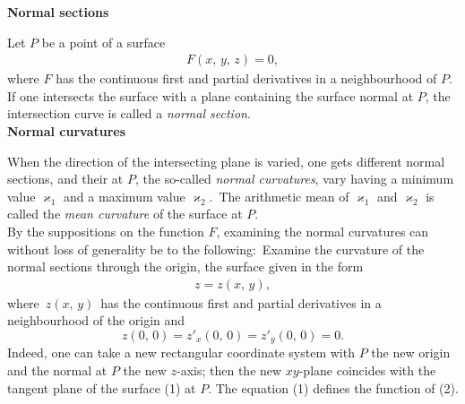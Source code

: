 \documentclass[12pt]{article}
\theoremstyle{definition}
\begin{document}

\textbf{Normal sections}

Let $P$ be a point of a surface
\begin{align}
F(x,\,y,\,z) = 0,
\end{align}
where $F$ has the continuous first and  partial derivatives in a neighbourhood of $P$.\, If one intersects the surface with a plane containing the surface normal at $P$, the intersection curve is called a {\em normal section}.\\

\textbf{Normal curvatures}

When the direction of the intersecting plane is varied, one gets different normal sections, and their  at $P$, the so-called {\em normal curvatures}, vary having a minimum value $\varkappa_1$ and a maximum value $\varkappa_2$.\, The arithmetic mean of $\varkappa_1$ and $\varkappa_2$ is called the {\em mean curvature} of the surface at $P$.\\

By the suppositions on the function $F$, examining the normal curvatures can without loss of generality be  to the following:\, Examine the curvature of the normal sections through the origin, the surface given in the form
\begin{align}
                        z = z(x,\,y),
\end{align}
where\, $z(x,\,y)$\, has the continuous first and  partial derivatives in a neighbourhood of the origin and 
  $$z(0,\,0) = z'_x(0,\,0) = z'_y(0,\,0) = 0.$$
Indeed, one can take a new rectangular coordinate system with $P$ the new origin and the normal at $P$ the new $z$-axis; then the new $xy$-plane coincides with the tangent plane of the surface (1) at $P$.  The equation (1) defines the function of (2).



\end{document}
